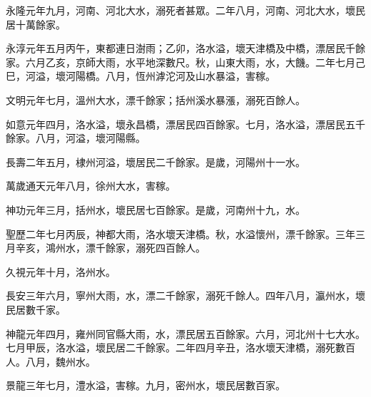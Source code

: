 \begin{pinyinscope}
 永隆元年九月，河南、河北大水，溺死者甚眾。二年八月，河南、河北大水，壞民居十萬餘家。



 永淳元年五月丙午，東都連日澍雨；乙卯，洛水溢，壞天津橋及中橋，漂居民千餘家。六月乙亥，京師大雨，水平地深數尺。秋，山東大雨，水，大饑。二年七月己巳，河溢，壞河陽橋。八月，恆州滹沱河及山水暴溢，害稼。



 文明元年七月，溫州大水，漂千餘家；括州溪水暴漲，溺死百餘人。



 如意元年四月，洛水溢，壞永昌橋，漂居民四百餘家。七月，洛水溢，漂居民五千餘家。八月，河溢，壞河陽縣。



 長壽二年五月，棣州河溢，壞居民二千餘家。是歲，河陽州十一水。



 萬歲通天元年八月，徐州大水，害稼。



 神功元年三月，括州水，壞民居七百餘家。是歲，河南州十九，水。



 聖歷二年七月丙辰，神都大雨，洛水壞天津橋。秋，水溢懷州，漂千餘家。三年三月辛亥，鴻州水，漂千餘家，溺死四百餘人。



 久視元年十月，洛州水。



 長安三年六月，寧州大雨，水，漂二千餘家，溺死千餘人。四年八月，瀛州水，壞民居數千家。



 神龍元年四月，雍州同官縣大雨，水，漂民居五百餘家。六月，河北州十七大水。七月甲辰，洛水溢，壞民居二千餘家。二年四月辛丑，洛水壞天津橋，溺死數百人。八月，魏州水。



 景龍三年七月，澧水溢，害稼。九月，密州水，壞民居數百家。




\end{pinyinscope}
